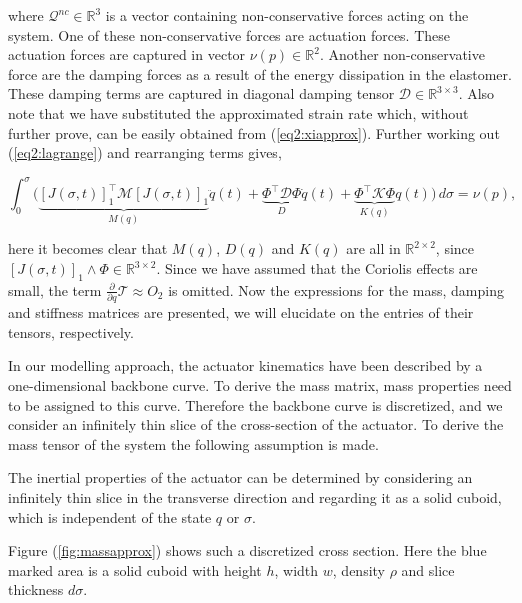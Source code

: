 where $\mathcal{Q}^{nc} \in \mathbb{R}^3$ is a vector containing non-conservative forces acting on the system. One of these non-conservative forces are actuation forces. These actuation forces are captured in vector $\nu(p) \in \mathbb{R}^2$. Another non-conservative force are the damping forces as a result of the energy dissipation in the elastomer. These damping terms are captured in diagonal damping tensor $\mathcal{D} \in \mathbb{R}^{3 \times 3}$. Also note that we have substituted the approximated strain rate which, without further prove, can be easily obtained from (\ref{eq2:xiapprox}). Further working out (\ref{eq2:lagrange}) and rearranging terms gives,

\begin{equation}
    \int_0^\sigma \Big( \underbrace{[J(\sigma,t)]_1^\top \mathcal{M} [J(\sigma,t)]_1}_{M(q)} \ddot{q}(t) +  \underbrace{\Phi^\top \mathcal{D} \Phi }_{D} \dot{q}(t)    +   \underbrace{\Phi^\top \mathcal{K} \Phi}_{K(q)} q(t)\Big) \hspace{2pt} d\sigma = \nu(p),
\end{equation}

here it becomes clear that $M(q)$, $D(q)$ and $K(q)$ are all in $\mathbb{R}^{2\times2}$, since $[J(\sigma,t)]_1 \land \Phi \in \mathbb{R}^{3 \times 2}$. Since we have assumed that the Coriolis effects are small, the term $\frac{\partial}{\partial q}\mathcal{T} \approx O_2 $ is omitted. Now the expressions for the mass, damping and stiffness matrices are presented, we will elucidate on the entries of their tensors, respectively.

In our modelling approach, the actuator kinematics have been described by a one-dimensional backbone curve. To derive the mass matrix, mass properties need to be assigned to this curve. Therefore the backbone curve is discretized, and we consider an infinitely thin slice of the cross-section of the actuator. To derive the mass tensor of the system the following assumption is made.

\begin{theorem}
The inertial properties of the actuator can be determined by considering an infinitely thin slice in the transverse direction and regarding it as a solid cuboid, which is independent of the state $q$ or $\sigma$.
\end{theorem}

Figure (\ref{fig:massapprox}) shows such a discretized cross section. Here the blue marked area is a solid cuboid with height $h$, width $w$, density $\rho$ and slice thickness $d\sigma$. 


